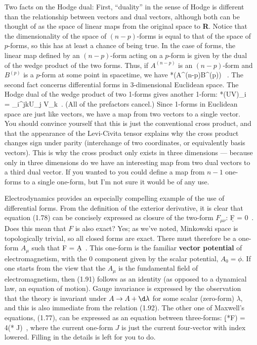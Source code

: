 Two facts on the Hodge dual:  First, ``duality'' in the sense of Hodge is 
different than the relationship between vectors and dual vectors, although 
both can be thought of as the space of linear maps from the original space 
to {\bf R}.  Notice that the dimensionality of the space of $(n-p)$-forms
is equal to that of the space of $p$-forms, so this has at least a chance
of being true.  In the case of forms, the linear map defined by an 
$(n-p)$-form acting on a $p$-form is given by the dual of the wedge
product of the two forms.  Thus, if $A^{(n-p)}$ is an $(n-p)$-form and 
$B^{(p)}$ is a $p$-form at some point in spacetime, we have
\be
  *(A^{(n-p)}\wedge B^{(p)}) \ .\label{1.89}
\ee
The second fact concerns differential forms in 3-dimensional Euclidean
space.  The Hodge dual of the wedge product of two 1-forms gives another
1-form:
\be
  *(U\wedge V)_i = \epsilon_i{}^{jk}U_j V_k\ .\label{1.90}
\ee
(All of the prefactors cancel.)  Since 1-forms in Euclidean space are
just like vectors, we have a map from two vectors to a single vector.
You should convince yourself that this is just the conventional
cross product, and that the appearance of the Levi-Civita tensor
explains why the cross product changes sign under parity (interchange
of two coordinates, or equivalently basis vectors).  This is why the
cross product only exists in three dimensions --- because only in three
dimensions do we have an interesting map from two dual vectors to a
third dual vector.  If you wanted to you could define a map from
$n-1$ one-forms to a single one-form, but I'm not sure it would be
of any use.

Electrodynamics provides an especially compelling example of the use
of differential forms.  From the definition of the exterior derivative,
it is clear that equation (1.78) can be concisely expressed as closure
of the two-form $F_{\mu\nu}$:
\be
  \d F = 0\ .\label{1.91}
\ee
Does this mean that $F$ is also exact?  Yes; as we've noted, Minkowski
space is topologically trivial, so all closed forms are exact.  There
must therefore be a one-form $A_\mu$ such that
\be
  F = \d A\ .\label{1.92}
\ee
This one-form is the familiar {\bf vector potential} of electromagnetism,
with the $0$ component given by the scalar potential, $A_0 = \phi$. 
If one starts from the view that the $A_\mu$ is the fundamental field
of electromagnetism, then (1.91) follows as an identity (as opposed to a
dynamical law, an equation of motion).  Gauge invariance is expressed
by the observation that the theory is invariant under $A \rightarrow
A +\d \lambda$ for some scalar (zero-form) $\lambda$, and this is also 
immediate from the relation (1.92). The
other one of Maxwell's equations, (1.77), can be expressed as an equation
between three-forms:
\be
  \d(*F) = 4\pi(* J)\ ,\label{1.93}
\ee
where the current one-form $J$ is just the current four-vector with
index lowered.  Filling in the details is left for you to do.

